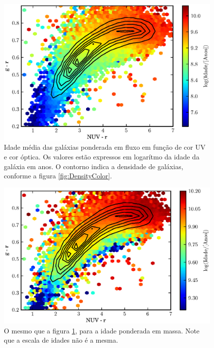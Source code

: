 \begin{figure}
	\includegraphics{figuras/uvcolor-color-at_flux.eps}
	\caption[Idade média das galáxias ponderada em fluxo no diagrama cor--cor UV.]
	{Idade média das galáxias ponderada em fluxo em função de cor UV e cor óptica.
	Os valores estão expressos em logarítmo da idade da galáxia em anos. O contorno
	indica a densidade de galáxias, conforme a figura \ref{fig:DensityColor}.}
	\label{fig:ATFluxColor}
\end{figure}

\begin{figure}
	\includegraphics{figuras/uvcolor-color-at_mass.eps}
	\caption[Idade média das galáxias ponderada em massa no diagrama cor--cor UV.]
	{O mesmo que a figura \ref{fig:ATFluxColor}, para a idade ponderada em massa.
	Note que a escala de idades não é a mesma.}
	\label{fig:ATMassColor}
\end{figure}

